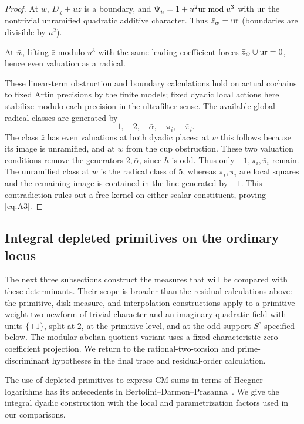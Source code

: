 \begin{proof}
At \(w\), \(D_\chi+uz\) is a boundary, and \(\Psi_u=1+u^2{\rm ur}\bmod u^3\) with \({\rm ur}\) the nontrivial unramified quadratic additive character. Thus \(\bar z_w={\rm ur}\) (boundaries are divisible by \(u^2\)). 

At \(\bar w\), lifting \(\bar z\) modulo \(u^3\) with the same leading coefficient forces \(\bar z_{\bar w}\cup {\rm ur}=0\), hence even valuation as a radical. 

These linear-term obstruction and boundary calculations hold on actual cochains to fixed Artin precisions by the finite models; fixed dyadic local actions here stabilize modulo each precision in the ultrafilter sense. The available global radical classes are generated by
\[
 -1,\quad 2,\quad\bar\alpha,\quad\pi_i,\quad\bar\pi_i.
\]
The class \(\bar z\) has even valuations at both dyadic places: at \(w\)
this follows because its image is unramified, and at \(\bar w\) from the
cup obstruction.  These two valuation conditions remove the generators
\(2,\bar\alpha\), since \(h\) is odd.  Thus only
\(-1,\pi_i,\bar\pi_i\) remain.  The unramified class at \(w\) is the
radical class of \(5\),
whereas \(\pi_i,\bar\pi_i\) are local squares and the remaining image is
contained in the line generated by \(-1\).  This contradiction rules out a
free kernel on either scalar constituent, proving \eqref{eq:A3}.
\end{proof}

\subsection{Integral depleted primitives on the ordinary locus}

The next three subsections construct the measures that will be compared
with these determinants.  Their scope is broader than the residual
calculations above: the primitive, disk-measure, and interpolation
constructions apply to a primitive weight-two newform of trivial
character and an imaginary quadratic field with units \(\{\pm1\}\),
split at \(2\), at the primitive level, and at the odd support
\(S^\circ\) specified below.
The modular-abelian-quotient variant uses a fixed characteristic-zero
coefficient projection.  We return to the rational-two-torsion and
prime-discriminant hypotheses in the final trace and residual-order
calculation.

The use of depleted primitives to express CM sums in terms of Heegner
logarithms has its antecedents in
Bertolini--Darmon--Prasanna~\cite[Sections~3.8 and~5.3]{BertoliniDarmonPrasanna2013}.
We give the integral dyadic construction with the local and
parametrization factors used in our comparisons.

